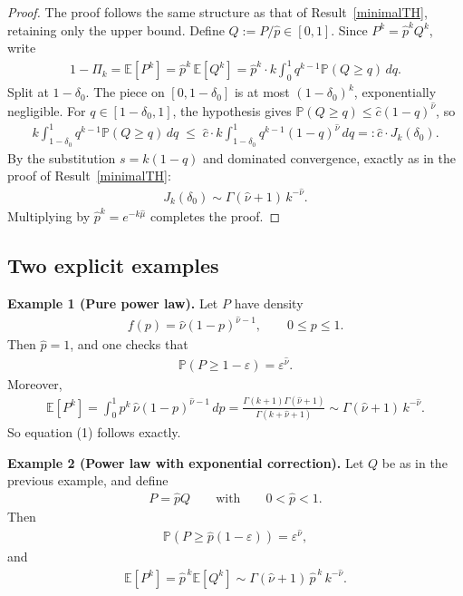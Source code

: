 \documentclass{article}
\theoremstyle{remark} %
\begin{document}
\begin{proof}
The proof follows the same structure as that of 
Result~\ref{minimalTH}, retaining only the upper bound.
Define $Q:=P/\hat{p}\in[0,1]$. Since $P^k=\hat{p}^k Q^k$, 
write
\begin{align}
1-\Pi_k = \mathbb{E}[P^k] = \hat{p}^k\,\mathbb{E}[Q^k]
= \hat{p}^k\cdot k\int_0^1 q^{k-1}\mathbb{P}(Q\ge q)\,dq.
\end{align}
Split at $1-\delta_0$. The piece on $[0,1-\delta_0]$ 
is at most $(1-\delta_0)^k$, exponentially negligible. 
For $q\in[1-\delta_0,1]$, the hypothesis gives 
$\mathbb{P}(Q\ge q)\le\hat{c}(1-q)^{\hat{\nu}}$, so
\begin{align}
k\int_{1-\delta_0}^1 q^{k-1}\mathbb{P}(Q\ge q)\,dq
\;\le\;
\hat{c}\cdot k\int_{1-\delta_0}^1 q^{k-1}(1-q)^{\hat{\nu}}\,dq
=: \hat{c}\cdot J_k(\delta_0).
\end{align}
By the substitution $s=k(1-q)$ and dominated convergence, 
exactly as in the proof of Result~\ref{minimalTH}:
\begin{align}
J_k(\delta_0)\sim\Gamma(\hat{\nu}+1)\,k^{-\hat{\nu}}.
\end{align}
Multiplying by $\hat{p}^k = e^{-k\hat{\mu}}$ completes the proof.
\end{proof}


\subsection*{Two explicit examples}

\textbf{Example 1 (Pure power law).}
Let $P$ have density
\begin{align}
f(p)=\hat{\nu}(1-p)^{\hat{\nu}-1},\qquad 0\le p\le 1.
\end{align}
Then $\hat{p}=1$, and one checks that
\begin{align}
\mathbb{P}(P\ge 1-\varepsilon)=\varepsilon^{\hat{\nu}}.
\end{align}
Moreover,
\begin{align}
\mathbb{E}[P^k]=\int_0^1 p^k\,\hat{\nu}(1-p)^{\hat{\nu}-1}\,dp
=
\frac{\Gamma(k+1)\Gamma(\hat{\nu}+1)}{\Gamma(k+\hat{\nu}+1)}
\sim \Gamma(\hat{\nu}+1)\,k^{-\hat{\nu}}.
\end{align}
So equation (1) follows exactly.

\medskip
\textbf{Example 2 (Power law with exponential correction).}
Let $Q$ be as in the previous example, and define
\begin{align}
P=\hat{p}Q
\qquad\text{with}\qquad
0<\hat{p}<1.
\end{align}
Then
\begin{align}
\mathbb{P}(P\ge \hat{p}(1-\varepsilon))=\varepsilon^{\hat{\nu}},
\end{align}
and
\begin{align}
\mathbb{E}[P^k]=\hat{p}^{\,k}\mathbb{E}[Q^k]\sim \Gamma(\hat{\nu}+1)\,\hat{p}^{\,k}\,k^{-\hat{\nu}}.
\end{align}
\end{document}
